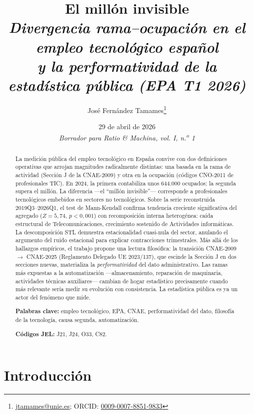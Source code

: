 \documentclass[11pt,a4paper]{article}
\title{\textbf{El millón invisible}\\[0.3em]
\large\itshape Divergencia rama--ocupación en el empleo tecnológico español\\
y la performatividad de la estadística pública (EPA T1 2026)}
\author[1]{José Fernández Tamames\thanks{
\href{mailto:jtamames@unie.es}{jtamames@unie.es};
ORCID: \href{https://orcid.org/0009-0007-8851-9833}{0009-0007-8851-9833}}}
\affil[1]{UNIE Universidad, Madrid · Cátedra de Filosofía y Tecnología}
\date{29 de abril de 2026 \\ \textit{Borrador para \textit{Ratio \& Machina}, vol. I, n.\textsuperscript{o} 1}}
\begin{document}
\maketitle

\begin{abstract}
\noindent
La medición pública del empleo tecnológico en España convive con dos definiciones
operativas que arrojan magnitudes radicalmente distintas: una basada en la rama
de actividad (Sección J de la CNAE-2009) y otra en la ocupación (códigos CNO-2011
de profesionales TIC). En 2024, la primera contabiliza unos 644.000 ocupados; la
segunda supera el millón. La diferencia ---el ``millón invisible''--- corresponde
a profesionales tecnológicos embebidos en sectores no tecnológicos. Sobre la
serie reconstruida 2019Q3--2026Q1, el test de Mann-Kendall confirma tendencia
creciente significativa del agregado ($Z = 5{,}74$, $p < 0{,}001$) con
recomposición interna heterogénea: caída estructural de Telecomunicaciones,
crecimiento sostenido de Actividades informáticas. La descomposición STL
demuestra estacionalidad cuasi-nula del sector, anulando el argumento del ruido
estacional para explicar contracciones trimestrales. Más allá de los hallazgos
empíricos, el trabajo propone una lectura filosófica: la transición CNAE-2009
$\rightarrow$ CNAE-2025 (Reglamento Delegado UE 2023/137), que escinde la
Sección J en dos secciones nuevas, materializa la \emph{performatividad} del
dato administrativo. Las ramas más expuestas a la automatización
---almacenamiento, reparación de maquinaria, actividades técnicas auxiliares---
cambian de hogar estadístico precisamente cuando más relevante sería medir su
evolución con consistencia. La estadística pública es ya un actor del fenómeno
que mide.

\medskip
\noindent\textbf{Palabras clave:} empleo tecnológico, EPA, CNAE, performatividad
del dato, filosofía de la tecnología, causa segunda, automatización.

\medskip
\noindent\textbf{Códigos JEL:} J21, J24, O33, C82.
\end{abstract}

\section{Introducción}
\end{document}
